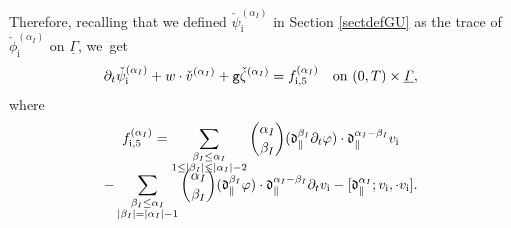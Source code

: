 \documentclass[JEP,XML,SOM,Unicode,NoFloatCountersInSection,published]{cedram}
\newcommand{\dpar}{{\mathfrak d}_{\parallel}}
\newcommand{\gr}{{\mathtt g}}
\newcommand{\dt}{\partial_t}
\newcommand{\ul}[1]{\underline{#1}}
\newcommand{\itGamma}{\mathit{\Gamma}}
\theoremstyle{definition}
\begin{document}
Therefore, recalling that we defined $\check\psi_\mathrm{i}^{(\alpha_I)}$ in Section \ref{sectdefGU} as the trace of
$\check{\phi}_\mathrm{i}^{(\alpha_I)}$ on $\ul{\itGamma}$, we~get
\begin{equation}\label{QLBC00}
\dt\check{\psi}_\mathrm{i}^{(\alpha_I)} + w\cdot\check{v}^{(\alpha_I)} + \gr\check{\zeta}^{(\alpha_I)} =f_{{\rm i},5}^{(\alpha_I)}
\quad\text{on } (0,T)\times\ul{\itGamma},
\end{equation}
where
\begin{multline*}
f_{{\rm i},5}^{(\alpha_I)}
= \sum_{\substack{\beta_I\leq\alpha_I\\ 1\leq|\beta_I|\leq|\alpha_I|-2}} \binom{\alpha_I}{\beta_I} (\dpar^{\beta_I}\dt\varphi)\cdot\dpar^{\alpha_I-\beta_I}v_\mathrm{i} \\[-8pt]
- \sum_{\substack{\beta_I\leq\alpha_I\\ |\beta_I|=|\alpha_I|-1}} \binom{\alpha_I}{\beta_I}(\dpar^{\beta_I}\varphi)\cdot\dpar^{\alpha_I-\beta_I}\dt v_\mathrm{i}
- [\dpar^{\alpha_I};v_\mathrm{i},\cdot v_\mathrm{i}].
\end{multline*}
\end{document}
